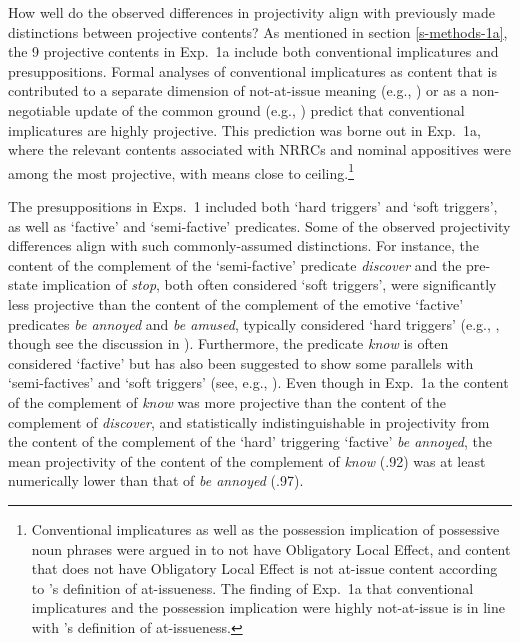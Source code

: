 \documentclass[11pt,fleqn]{article}
\newcommand{\6}{\mbox{$[\hspace*{-.6mm}[$}}
\newcommand{\9}{\mbox{$]\hspace*{-.6mm}]$}}
\newcommand{\citepos}[1]{\citeauthor{#1}'s \citeyear{#1}}
\begin{document}
How well do the observed differences in projectivity align with previously made distinctions between projective contents? As mentioned in section \ref{s-methods-1a}, the 9 projective contents in Exp.~1a include both conventional implicatures and presuppositions. Formal analyses of conventional implicatures as content that is contributed to a separate dimension of not-at-issue meaning (e.g., \citealt{potts05}) or as a non-negotiable update of the common ground (e.g., \citealt{murray2014,anderbois-etal2015}) predict that conventional implicatures are highly projective. This prediction was borne out in Exp.~1a, where the relevant contents associated with NRRCs and nominal appositives were among the most projective, with means close to ceiling.\footnote{Conventional implicatures as well as the possession implication of possessive noun phrases were argued in \citealt{brst-lang11} to not have Obligatory Local Effect, and content that does not have Obligatory Local Effect is not at-issue content according to \citepos{brst-ar} definition of at-issueness. The finding of Exp.~1a that conventional implicatures and the possession implication were highly not-at-issue is in line with \citepos{brst-ar}  definition of at-issueness.} 

The presuppositions in Exps.~1 included both `hard triggers' and `soft triggers', as well as `factive' and `semi-factive' predicates. Some of the observed projectivity differences align with such commonly-assumed distinctions. For instance, the content of the complement of the `semi-factive' predicate {\em discover} and the pre-state implication of {\em stop}, both often considered `soft triggers', were significantly less projective than the content of the complement of the emotive `factive' predicates {\em be annoyed} and {\em be amused}, typically considered `hard triggers' (e.g., \citealt{abusch10}, though see the discussion in \citealt{abrusan2011,abrusan2016}). Furthermore, the predicate {\em know} is often considered `factive' but has also been suggested to show some parallels with `semi-factives' and `soft triggers' (see, e.g., \citealt{kiparsky-kiparsky71,levinson83,simons01,chemla09b,beaver-geurts-sep}). Even though in Exp.~1a the content of the complement of {\em know} was more projective than the content of the complement of {\em discover}, and statistically indistinguishable in projectivity from the content of the complement of the `hard' triggering `factive' {\em be annoyed}, the mean projectivity of the content of the complement of {\em know} (.92) was at least numerically lower than that of {\em be annoyed} (.97).
\end{document}
